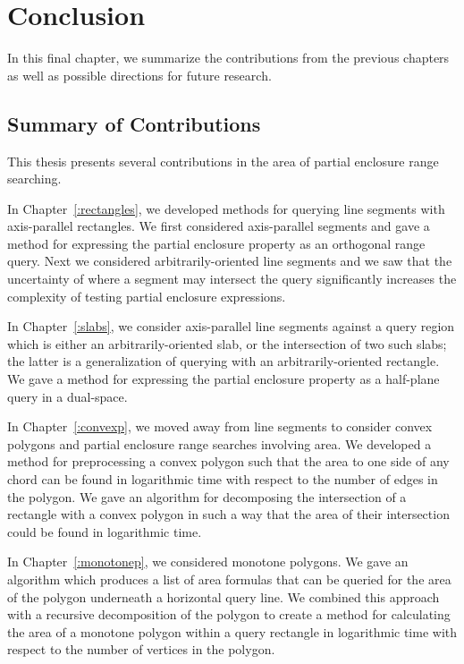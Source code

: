\chapter{Conclusion}
\label{:conclusion}

In this final chapter, we summarize the contributions from the previous chapters as well as possible directions for future research.

\section{Summary of Contributions}
\label{:conclusion:contributions}

This thesis presents several contributions in the area of partial enclosure range searching.

In Chapter~\ref{:rectangles}, we developed methods for querying line segments with axis-parallel rectangles. 
We first considered axis-parallel segments and gave a method for expressing the partial enclosure property as an orthogonal range query. 
Next we considered arbitrarily-oriented line segments and we saw that the uncertainty of where a segment may intersect the query significantly increases the complexity of testing partial enclosure expressions.

In Chapter~\ref{:slabs}, we consider axis-parallel line segments against a query region which is either an arbitrarily-oriented slab, or the intersection of two such slabs; the latter is a generalization of querying with an arbitrarily-oriented rectangle. 
We gave a method for expressing the partial enclosure property as a half-plane query in a dual-space.

In Chapter~\ref{:convexp}, we moved away from line segments to consider convex polygons and partial enclosure range searches involving area. 
We developed a method for preprocessing a convex polygon such that the area to one side of any chord can be found in logarithmic time with respect to the number of edges in the polygon. 
We gave an algorithm for decomposing the intersection of a rectangle with a convex polygon in such a way that the area of their intersection could be found in logarithmic time. 

In Chapter~\ref{:monotonep}, we considered monotone polygons. 
We gave an algorithm which produces a list of area formulas that can be queried for the area of the polygon underneath a horizontal query line.
We combined this approach with a recursive decomposition of the polygon to create a method for calculating the area of a monotone polygon within a query rectangle in logarithmic time with respect to the number of vertices in the polygon. 


